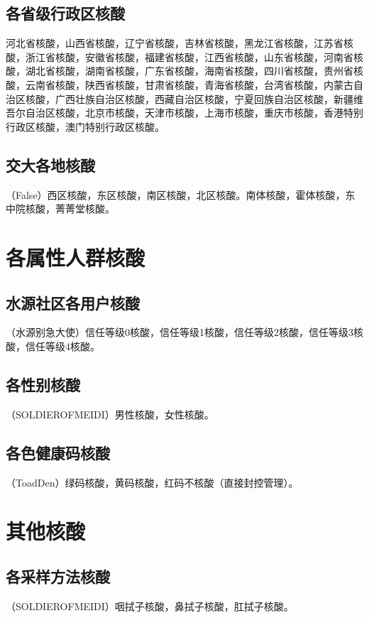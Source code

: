 \documentclass{ctexbook}
\begin{document}
\section{各省级行政区核酸}
河北省核酸，山西省核酸，辽宁省核酸，吉林省核酸，黑龙江省核酸，江苏省核酸，浙江省核酸，安徽省核酸，福建省核酸，江西省核酸，山东省核酸，河南省核酸，湖北省核酸，湖南省核酸，广东省核酸，海南省核酸，四川省核酸，贵州省核酸，云南省核酸，陕西省核酸，甘肃省核酸，青海省核酸，台湾省核酸，内蒙古自治区核酸，广西壮族自治区核酸，西藏自治区核酸，宁夏回族自治区核酸，新疆维吾尔自治区核酸，北京市核酸，天津市核酸，上海市核酸，重庆市核酸，香港特别行政区核酸，澳门特别行政区核酸。

\section{交大各地核酸}
（False）西区核酸，东区核酸，南区核酸，北区核酸。南体核酸，霍体核酸，东中院核酸，菁菁堂核酸。

\chapter{各属性人群核酸}

\section{水源社区各用户核酸}
（水源别急大使）信任等级0核酸，信任等级1核酸，信任等级2核酸，信任等级3核酸，信任等级4核酸。

\section{各性别核酸}
（SOLDIEROFMEIDI）男性核酸，女性核酸。

\section{各色健康码核酸}
（ToadDen）绿码核酸，黄码核酸，红码不核酸（直接封控管理）。

\chapter{其他核酸}

\section{各采样方法核酸}
（SOLDIEROFMEIDI）咽拭子核酸，鼻拭子核酸，肛拭子核酸。
\end{document}

